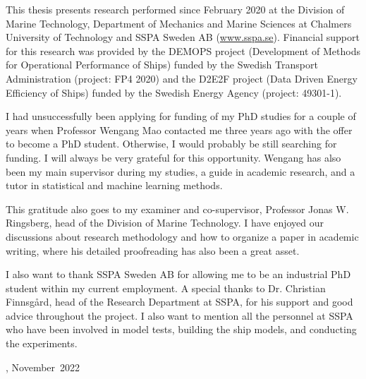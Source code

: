 This thesis presents research performed since February 2020 at the Division of Marine Technology, Department of Mechanics and Marine Sciences at Chalmers University of Technology and SSPA Sweden AB (\href{www.sspa.se}{www.sspa.se}). Financial support for this research was provided by the DEMOPS project (Development of Methods for Operational Performance of Ships) funded by the Swedish Transport Administration (project: FP4 2020) and the D2E2F project (Data Driven Energy Efficiency of Ships) funded by the Swedish Energy Agency (project: 49301-1).

I had unsuccessfully been applying for funding of my PhD studies for a couple of years when Professor Wengang Mao contacted me three years ago with the offer to become a PhD student. Otherwise, I would probably be still searching for funding. I will always be very grateful for this opportunity. Wengang has also been my main supervisor during my studies, a guide in academic research, and a tutor in statistical and machine learning methods. 

This gratitude also goes to my examiner and co-supervisor, Professor Jonas W. Ringsberg,
head of the Division of Marine Technology. I have enjoyed our discussions about research methodology and how to organize a paper in academic writing, where his detailed proofreading has also been a great asset.

I also want to thank SSPA Sweden AB for allowing me to be an industrial PhD student within my current employment. A special thanks to Dr. Christian Finnsgård, head of the Research Department at SSPA, for his support and good advice throughout the project. I also want to mention all the personnel at SSPA who have been involved in model tests, building the ship models, and conducting the experiments.

\vskip 2pc

\noindent \thesisauthor

\noindent \thesiscity, November\ 2022 %

